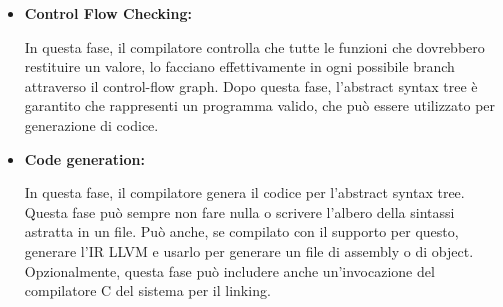 \documentclass[a4paper]{article}
\begin{document}
\begin{itemize}
    \item \textbf{Control Flow Checking:}
    
    In questa fase, il compilatore controlla che tutte le funzioni che dovrebbero restituire un
    valore, lo facciano effettivamente in ogni possibile branch attraverso il control-flow graph.
    Dopo questa fase, l'abstract syntax tree è garantito che rappresenti un programma valido, che
    può essere utilizzato per generazione di codice.

    \item \textbf{Code generation:}

    In questa fase, il compilatore genera il codice per l'abstract syntax tree. Questa fase può
    sempre non fare nulla o scrivere l'albero della sintassi astratta in un file. Può anche, se
    compilato con il supporto per questo, generare l'IR LLVM e usarlo per generare un file di
    assembly o di object. Opzionalmente, questa fase può includere anche un'invocazione del
    compilatore C del sistema per il linking.
\end{itemize}

\newpage
\end{document}
